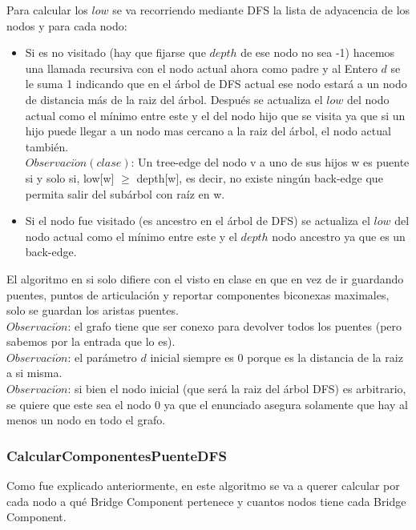 Para calcular los $low$ se va recorriendo mediante DFS la lista de adyacencia de los nodos y para cada nodo:
\begin{itemize}
	\item Si es no visitado (hay que fijarse que $depth$ de ese nodo no sea -1) hacemos una llamada recursiva con el nodo
	actual ahora como padre y al Entero $d$ se le suma 1 indicando que en el \'arbol de DFS actual ese nodo
	estará a un nodo de distancia más de la raiz del \'arbol. Después se actualiza el $low$ del nodo actual
	como el mínimo entre este y el del nodo hijo que se visita ya que si un hijo puede llegar a un nodo
	mas cercano a la raiz del \'arbol, el nodo actual también. \\
	$Observaci\acute{o}n (clase)$: Un tree-edge del nodo v a uno de sus hijos w es puente si y solo si, low[w] $\ge$ depth[w], es decir, 
	no existe ning\'un back-edge que permita salir del sub\'arbol con ra\'iz en w.
	\item Si el nodo fue visitado (es ancestro en el \'arbol de DFS) se actualiza el $low$ del nodo actual
	como el mínimo entre este y el $depth$ nodo ancestro ya que es un back-edge.
\end{itemize}

El algoritmo en si solo difiere con el visto en clase en que en vez de ir guardando puentes, puntos de 
articulación y reportar componentes biconexas maximales, solo se guardan los aristas puentes. \\

$Observaci\acute{o}n$: el grafo tiene que ser conexo para devolver todos los puentes (pero sabemos por la entrada que lo es). \\

$Observaci\acute{o}n$: el parámetro $d$ inicial siempre es 0 porque es la distancia de la raiz a si misma. \\

$Observaci\acute{o}n$: si bien el nodo inicial (que será la raiz del \'arbol DFS) es arbitrario, se quiere que
este sea el nodo 0 ya que el enunciado asegura solamente que hay al menos un nodo en todo el grafo. \\

\subsubsection*{CalcularComponentesPuenteDFS}

Como fue explicado anteriormente, en este algoritmo se va a querer calcular por cada nodo a qué Bridge Component pertenece
y cuantos nodos tiene cada Bridge Component. \\

